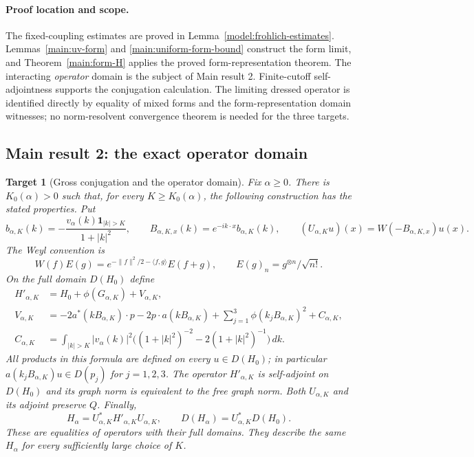 \documentclass[11pt,a4paper]{article}
\newtheorem{target}{Target}
\theoremstyle{definition}
\theoremstyle{remark}
\begin{document}
\paragraph{Proof location and scope.}
The fixed-coupling estimates are proved in
Lemma~\ref{model:frohlich-estimates}. Lemmas~\ref{main:uv-form} and
\ref{main:uniform-form-bound} construct the form limit, and
Theorem~\ref{main:form-H} applies the proved form-representation theorem.
The interacting \emph{operator} domain is the subject of Main result 2.
Finite-cutoff self-adjointness supports the conjugation calculation.
The limiting dressed operator is identified directly by equality of
mixed forms and the form-representation domain witnesses; no
norm-resolvent convergence theorem is needed for the three targets.

\subsection{Main result 2: the exact operator domain}

\begin{target}[Gross conjugation and the operator domain]
\label{target:domain}
Fix $\alpha\geq0$. There is $K_0(\alpha)>0$ such that, for every
$K\geq K_0(\alpha)$, the following construction has the stated properties.
Put
\[
 b_{\alpha,K}(k)=-\frac{v_\alpha(k)\mathbf1_{|k|>K}}{1+|k|^2},\qquad
 B_{\alpha,K,x}(k)=e^{-ik\cdot x}b_{\alpha,K}(k),\qquad
 (U_{\alpha,K}u)(x)=W(-B_{\alpha,K,x})u(x).
\]
The Weyl convention is
\[
 W(f)E(g)=e^{-\|f\|^2/2-\langle f,g\rangle}E(f+g),\qquad
 E(g)_n=g^{\otimes n}/\sqrt{n!}.
\]
On the full domain $D(H_0)$ define
\begin{align*}
 H'_{\alpha,K}&=H_0+\phi(G_{\alpha,K})+V_{\alpha,K},\\
 V_{\alpha,K}&=-2a^*(kB_{\alpha,K})\cdot p
               -2p\cdot a(kB_{\alpha,K})
               +\sum_{j=1}^3\phi(k_jB_{\alpha,K})^2+C_{\alpha,K},\\
 C_{\alpha,K}&=\int_{|k|>K}|v_\alpha(k)|^2
             \bigl((1+|k|^2)^{-2}-2(1+|k|^2)^{-1}\bigr)\,dk.
\end{align*}
All products in this formula are defined on every $u\in D(H_0)$;
in particular $a(k_jB_{\alpha,K})u\in D(p_j)$ for $j=1,2,3$.
The operator $H'_{\alpha,K}$ is self-adjoint on $D(H_0)$ and its graph
norm is equivalent to the free graph norm. Both $U_{\alpha,K}$ and its
adjoint preserve $Q$. Finally,
\[
 \boxed{\ H_\alpha=U_{\alpha,K}^*H'_{\alpha,K}U_{\alpha,K},\qquad
 D(H_\alpha)=U_{\alpha,K}^*D(H_0).\ }
\]
These are equalities of operators with their full domains. They describe
the same $H_\alpha$ for every sufficiently large choice of $K$.
\end{target}
\end{document}
